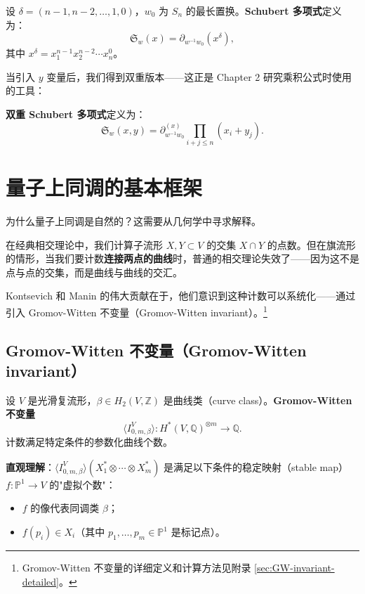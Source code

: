 \begin{Definition}
\label{def:ClassicalSchubert}
设 $\delta = (n-1,n-2,\ldots,1,0)$，$w_0$ 为 $S_n$ 的最长置换。\textbf{Schubert 多项式}定义为：
\begin{equation}
\mathfrak{S}_w(x) = \partial_{w^{-1}w_0}(x^{\delta}),
\label{eq:SchubertPolynomial}
\end{equation}
其中 $x^{\delta} = x_1^{n-1}x_2^{n-2}\cdots x_n^0$。
\end{Definition}

当引入 $y$ 变量后，我们得到双重版本——这正是 Chapter 2 研究乘积公式时使用的工具：

\begin{Definition}
\label{def:DoubleSchubert}
\textbf{双重 Schubert 多项式}定义为：
\begin{equation}
\mathfrak{S}_w(x,y) = \partial_{w^{-1}w_0}^{(x)} \prod_{i+j\leq n}(x_i + y_j).
\label{eq:DoubleSchubert}
\end{equation}
\end{Definition}

\section{量子上同调的基本框架}
\label{sec:QuantumCohomologyFramework}

为什么量子上同调是自然的？这需要从几何学中寻求解释。

在经典相交理论中，我们计算子流形 $X, Y \subset V$ 的交集 $X \cap Y$ 的点数。但在旗流形的情形，当我们要计数\textbf{连接两点的曲线}时，普通的相交理论失效了——因为这不是点与点的交集，而是曲线与曲线的交汇。

Kontsevich 和 Manin 的伟大贡献在于，他们意识到这种计数可以系统化——通过引入 Gromov-Witten 不变量（Gromov-Witten invariant）。\footnote{Gromov-Witten 不变量的详细定义和计算方法见附录 \cref{sec:GW-invariant-detailed}。}

\subsection{Gromov-Witten 不变量（Gromov-Witten invariant）}

设 $V$ 是光滑复流形，$\beta \in H_2(V, \mathbb{Z})$ 是曲线类（curve class）。\textbf{Gromov-Witten 不变量}
\[
\langle I_{0,m,\beta}^V \rangle : H^*(V, \mathbb{Q})^{\otimes m} \longrightarrow \mathbb{Q}.
\label{eq:GromovWittenInvariant}
\]
计数满足特定条件的参数化曲线个数。

\textbf{直观理解}：$ \langle I_{0,m,\beta}^V \rangle(X_1^* \otimes \cdots \otimes X_m^*) $ 是满足以下条件的稳定映射（stable map） $f: \mathbb{P}^1 \to V$ 的"虚拟个数"：
\begin{itemize}
\item $f$ 的像代表同调类 $\beta$；
\item $f(p_i) \in X_i$（其中 $p_1, \ldots, p_m \in \mathbb{P}^1$ 是标记点）。
\end{itemize}

